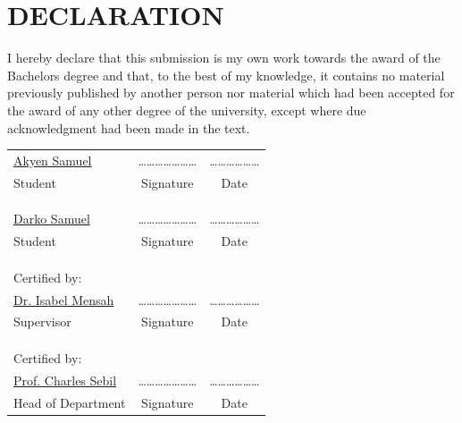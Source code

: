 \chapter*{DECLARATION}

I hereby declare that this submission is my own work towards the award of the Bachelors degree and that,
to the best of my knowledge, it contains no material previously published by another person nor material
which had been accepted for the award of any other degree of the university, except where due 
acknowledgment had been made in the text.\\

\begin{center}
 \begin{tabular}{lcc}
 \underline{Akyen Samuel} &\quad\quad\quad \ldots\ldots\ldots\ldots\ldots\ldots\ldots &\quad\quad\quad \ldots\ldots\ldots\ldots\ldots\ldots \\
 Student &\quad\quad\quad Signature &\quad\quad\quad Date \\
 & & \\
 & & \\
 & & \\

  \underline{Darko Samuel} &\quad\quad\quad \ldots\ldots\ldots\ldots\ldots\ldots\ldots &\quad\quad\quad \ldots\ldots\ldots\ldots\ldots\ldots \\
 Student &\quad\quad\quad Signature &\quad\quad\quad Date \\
 & & \\
 & & \\
 & & \\


  Certified by: & &\\
 \underline{Dr. Isabel Mensah} &\quad\quad\quad \ldots\ldots\ldots\ldots\ldots\ldots\ldots &\quad\quad\quad \ldots\ldots\ldots\ldots\ldots\ldots \\
 Supervisor &\quad\quad\quad Signature &\quad\quad\quad Date \\
 & & \\
 & & \\
 & & \\
 Certified by: & &\\
\underline{Prof. Charles Sebil} &\quad\quad\quad \ldots\ldots\ldots\ldots\ldots\ldots\ldots &\quad\quad\quad \ldots\ldots\ldots\ldots\ldots\ldots \\
 Head of Department &\quad\quad\quad Signature &\quad\quad\quad Date
\end{tabular}
\end{center}